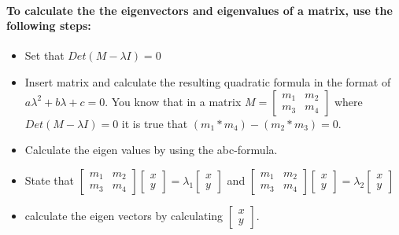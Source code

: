 \documentclass[11pt]{report}
\begin{document}
    \paragraph{
    To calculate the the eigenvectors and eigenvalues of a matrix, use the following steps:
    }

    \begin{itemize}
        \item Set that \(Det(M - \lambda I) = 0\)
        \item Insert matrix and calculate the resulting quadratic formula in the format of \(a \lambda^2 + b \lambda + c = 0\). You know that in a matrix \(M = \begin{bmatrix} m_1 & m_2 \\ m_3 & m_4 \end{bmatrix}\) where \(Det(M - \lambda I) = 0\) it is true that \((m_1*m_4) - (m_2*m_3) = 0\).
        \item Calculate the eigen values by using the abc-formula.
        \item State that \(\begin{bmatrix} m_1 & m_2 \\ m_3 & m_4 \end{bmatrix} \begin{bmatrix} x \\y \end{bmatrix} = \lambda_1 \begin{bmatrix} x \\ y\end{bmatrix}\) and \(\begin{bmatrix} m_1 & m_2 \\ m_3 & m_4 \end{bmatrix} \begin{bmatrix} x \\y \end{bmatrix} = \lambda_2 \begin{bmatrix} x \\ y\end{bmatrix}\)
        \item calculate the eigen vectors by calculating \(\begin{bmatrix} x \\ y\end{bmatrix}\).
    \end{itemize}
\end{document}
